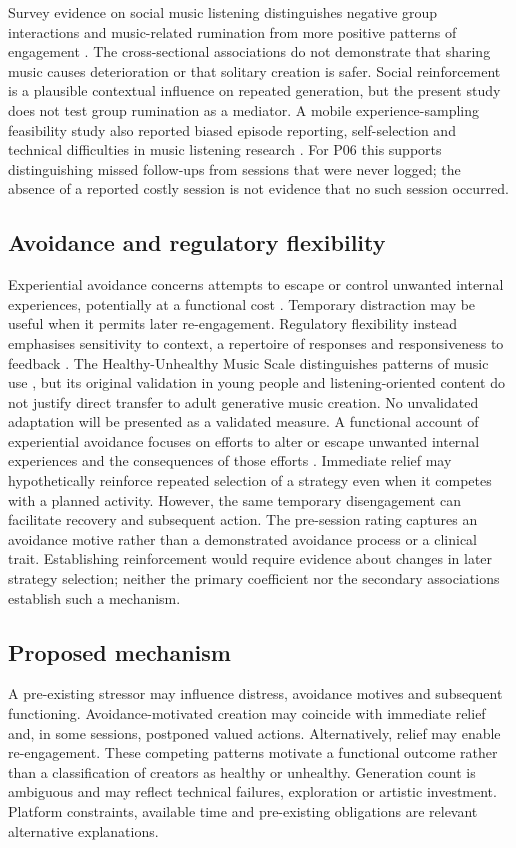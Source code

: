 \documentclass[11pt]{article}
\begin{document}
Survey evidence on social music listening distinguishes negative group interactions and music-related rumination from more positive patterns of engagement \citep{garrido2017}. The cross-sectional associations do not demonstrate that sharing music causes deterioration or that solitary creation is safer. Social reinforcement is a plausible contextual influence on repeated generation, but the present study does not test group rumination as a mediator. A mobile experience-sampling feasibility study also reported biased episode reporting, self-selection and technical difficulties in music listening research \citep{mcferran2025}. For P06 this supports distinguishing missed follow-ups from sessions that were never logged; the absence of a reported costly session is not evidence that no such session occurred.

\subsection{Avoidance and regulatory flexibility}
Experiential avoidance concerns attempts to escape or control unwanted internal experiences, potentially at a functional cost \citep{gamez2014}. Temporary distraction may be useful when it permits later re-engagement. Regulatory flexibility instead emphasises sensitivity to context, a repertoire of responses and responsiveness to feedback \citep{bonanno2013}. The Healthy-Unhealthy Music Scale distinguishes patterns of music use \citep{saarikallio2015}, but its original validation in young people and listening-oriented content do not justify direct transfer to adult generative music creation. No unvalidated adaptation will be presented as a validated measure.
A functional account of experiential avoidance focuses on efforts to alter or escape unwanted internal experiences and the consequences of those efforts \citep{hayes1996}. Immediate relief may hypothetically reinforce repeated selection of a strategy even when it competes with a planned activity. However, the same temporary disengagement can facilitate recovery and subsequent action. The pre-session rating captures an avoidance motive rather than a demonstrated avoidance process or a clinical trait. Establishing reinforcement would require evidence about changes in later strategy selection; neither the primary coefficient nor the secondary associations establish such a mechanism.

\subsection{Proposed mechanism}
A pre-existing stressor may influence distress, avoidance motives and subsequent functioning. Avoidance-motivated creation may coincide with immediate relief and, in some sessions, postponed valued actions. Alternatively, relief may enable re-engagement. These competing patterns motivate a functional outcome rather than a classification of creators as healthy or unhealthy. Generation count is ambiguous and may reflect technical failures, exploration or artistic investment. Platform constraints, available time and pre-existing obligations are relevant alternative explanations.
\end{document}
